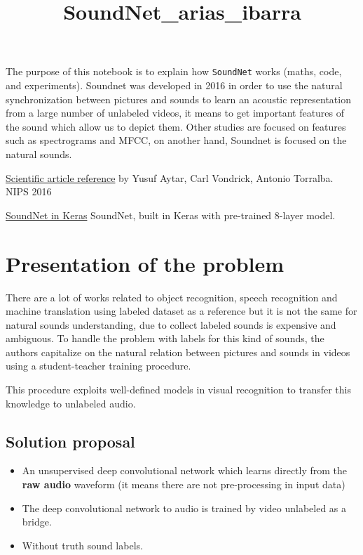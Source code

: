 \documentclass[11pt]{article}
\title{SoundNet\_arias\_ibarra}
\providecommand{\tightlist}{%
      \setlength{\itemsep}{0pt}\setlength{\parskip}{0pt}}
\begin{document}
    
    
    \maketitle
    
    

    
    

    The purpose of this notebook is to explain how \texttt{SoundNet} works
(maths, code, and experiments). Soundnet was developed in 2016 in order
to use the natural synchronization between pictures and sounds to learn
an acoustic representation from a large number of unlabeled videos, it
means to get important features of the sound which allow us to depict
them. Other studies are focused on features such as spectrograms and
MFCC, on another hand, Soundnet is focused on the natural sounds.

\href{https://arxiv.org/pdf/1610.09001.pdf}{Scientific article
reference} by Yusuf Aytar, Carl Vondrick, Antonio Torralba. NIPS 2016

\href{https://github.com/brain-bzh/soundnet_keras}{SoundNet in Keras}
SoundNet, built in Keras with pre-trained 8-layer model.

    \section{Presentation of the problem}\label{presentation-of-the-problem}

There are a lot of works related to object recognition, speech
recognition and machine translation using labeled dataset as a reference
but it is not the same for natural sounds understanding, due to collect
labeled sounds is expensive and ambiguous. To handle the problem with
labels for this kind of sounds, the authors capitalize on the natural
relation between pictures and sounds in videos using a student-teacher
training procedure.

This procedure exploits well-defined models in visual recognition to
transfer this knowledge to unlabeled audio.

    \subsection{Solution proposal}\label{solution-proposal}

\begin{itemize}
\tightlist
\item
  An unsupervised deep convolutional network which learns directly from
  the \textbf{raw audio} waveform (it means there are not pre-processing
  in input data)
\item
  The deep convolutional network to audio is trained by video unlabeled
  as a bridge.
\item
  Without truth sound labels.
\end{itemize}
\end{document}
